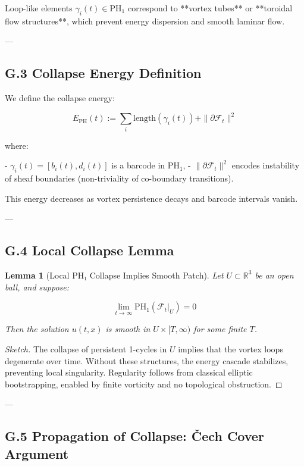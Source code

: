 \documentclass[11pt]{article}
\newtheorem{lemma}[theorem]{Lemma}
\begin{document}
{Loop-like elements \( \gamma_i(t) \in \mathrm{PH}_1 \) correspond to **vortex tubes** or **toroidal flow structures**, which prevent energy dispersion and smooth laminar flow.

---

\subsection*{G.3 Collapse Energy Definition}

We define the collapse energy:

\[
E_{\mathrm{PH}}(t) := \sum_i \mathrm{length}(\gamma_i(t)) + \|\partial \mathcal{F}_t\|^2
\]

where:

- \( \gamma_i(t) = [b_i(t), d_i(t)] \) is a barcode in \( \mathrm{PH}_1 \),
- \( \|\partial \mathcal{F}_t\|^2 \) encodes instability of sheaf boundaries (non-triviality of co-boundary transitions).

This energy decreases as vortex persistence decays and barcode intervals vanish.

---

\subsection*{G.4 Local Collapse Lemma}

\begin{lemma}[Local PH₁ Collapse Implies Smooth Patch]
Let \( U \subset \mathbb{R}^3 \) be an open ball, and suppose:

\[
\lim_{t \to \infty} \mathrm{PH}_1(\mathcal{F}_t|_U) = 0
\]

Then the solution \( u(t,x) \) is smooth in \( U \times [T, \infty) \) for some finite \( T \).
\end{lemma}

\begin{proof}[Sketch]
The collapse of persistent 1-cycles in \( U \) implies that the vortex loops degenerate over time.  
Without these structures, the energy cascade stabilizes, preventing local singularity.  
Regularity follows from classical elliptic bootstrapping, enabled by finite vorticity and no topological obstruction.
\end{proof}

---

\subsection*{G.5 Propagation of Collapse: Čech Cover Argument}

}
\end{document}
